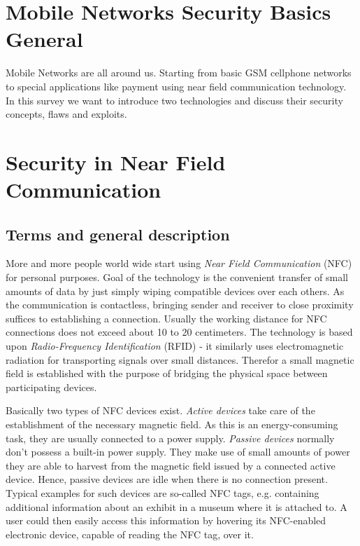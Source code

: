 \documentclass[12pt,a4paper]{article}
\begin{document}
\section{Mobile Networks Security Basics General}
Mobile Networks are all around us. Starting from basic GSM cellphone networks to special applications like payment using near field communication technology. In this survey we want to introduce two technologies and discuss their security concepts, flaws and exploits.

\section{Security in Near Field Communication}

\subsection{Terms and general description}

More and more people world wide start using \emph{Near Field Communication} (NFC) for personal purposes. Goal of the technology is the convenient transfer of small amounts of data by just simply wiping compatible devices over each others. As the communication is contactless, bringing sender and receiver to close proximity suffices to establishing a connection. Usually the working distance for NFC connections does not exceed about 10 to 20 centimeters. The technology is based upon \emph{Radio-Frequency Identification} (RFID) - it 	similarly uses electromagnetic radiation for transporting signals over small distances. Therefor a small magnetic field is established with the purpose of bridging the physical space between participating devices.

Basically two types of NFC devices exist. \emph{Active devices} take care of the establishment of the necessary magnetic field. As this is an energy-consuming task, they are usually connected to a power supply. \emph{Passive devices} normally don't possess a built-in power supply. They make use of small amounts of power they are able to harvest from the magnetic field issued by a connected active device. Hence, passive devices are idle when there is no connection present. Typical examples for such devices are so-called NFC tags, e.g. containing additional information about an exhibit in a museum where it is attached to. A user could then easily access this information by hovering its NFC-enabled electronic device, capable of reading the NFC tag, over it.
\end{document}
